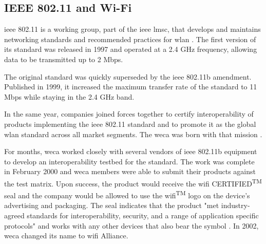 \subsection{IEEE 802.11 and Wi-Fi}

\gls{ieee} 802.11 is a working group, part of the \gls{ieee} \gls{lmsc}, that develops and maintains networking standards and recommended practices for \gls{wlan} \cite{about_ieee_p80211}. The first version of its standard was released in 1997 and operated at a 2.4 \gls{G}\gls{Hz} frequency, allowing data to be transmitted up to 2 \gls{M}\gls{b}\gls{ps}.

The original standard was quickly superseded by the \gls{ieee} 802.11b amendment. Published in 1999, it increased the maximum transfer rate of the standard to 11 \gls{M}\gls{b}\gls{ps} while staying in the 2.4 \gls{G}\gls{Hz} band.

In the same year, companies joined forces together to certify interoperability of products implementing the \gls{ieee} 802.11 standard and to promote it as the global \gls{wlan} standard across all market segments. The \gls{weca} was born with that mission \cite{weca_mission}.

For months, \gls{weca} worked closely with several vendors of \gls{ieee} 802.11b equipment to develop an interoperability testbed for the standard. The work was complete in February 2000 and \gls{weca} members were able to submit their products against the test matrix. Upon success, the product would receive the \gls{wifi} CERTIFIED\textsuperscript{TM} seal and the company would be allowed to use the \gls{wifi}\textsuperscript{TM} logo on the device’s advertising and packaging. The seal indicates that the product "met industry-agreed standards for interoperability, security, and a range of application specific protocols" and works with any other devices that also bear the symbol \cite{wifi_certification}. In 2002, \gls{weca} changed its name to \gls{wifi} Alliance.

\begin{table}[h]
    \caption{\gls{ieee} 802.11 Amendment to \gls{wifi} Generation mapping}
    \label{table:map_80211_wifi}
\end{table}

